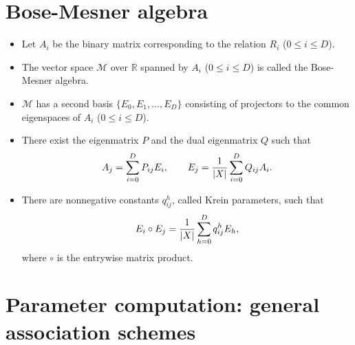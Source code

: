 \documentclass[11pt]{article}
\renewcommand{\textbf}[1]{\textcolor[rgb]{1,0,0}{{#1}}}
\renewcommand{\emph}[1]{\textcolor[rgb]{0,0,1}{{#1}}}
\renewcommand{\sout}[1]{\textcolor[rgb]{0,0.5,0}{{#1}}}
\begin{document}
    \hypertarget{bose-mesner-algebra}{%
\section*{Bose-Mesner algebra}\label{bose-mesner-algebra}}

\begin{itemize}
\item
  Let \textbf{\(A_i\)} be the \emph{binary matrix} corresponding to the
  relation \emph{\(R_i\)} (\(0 \le i \le D\)).
\item
  The vector space \textbf{\(\mathcal{M}\)} over \emph{\(\mathbb{R}\)}
  spanned by \emph{\(A_i\)} (\(0 \le i \le D\)) is called the
  \textbf{Bose-Mesner algebra}.
\item
  \emph{\(\mathcal{M}\)} has a second basis
  \sout{\(\{E_0, E_1, \dots, E_D\}\)} consisting of \emph{projectors} to
  the \emph{common eigenspaces} of \emph{\(A_i\)} (\(0 \le i \le D\)).
\item
  There exist the \textbf{eigenmatrix} \sout{\(P\)} and the \textbf{dual
  eigenmatrix} \sout{\(Q\)} such that \emph{\[
  A_j = \sum_{i=0}^D P_{ij} E_i, \qquad E_j = {1 \over |X|} \sum_{i=0}^D Q_{ij} A_i.
  \]}
\item
  There are \sout{nonnegative} constants \textbf{\(q^h_{ij}\)}, called
  \textbf{Krein parameters}, such that \textbf{\[
  E_i \circ E_j = {1 \over |X|} \sum_{h=0}^D q^h_{ij} E_h ,
  \]} where \textbf{\(\circ\)} is the \emph{entrywise matrix product}.
\end{itemize}

\newpage

    \hypertarget{parameter-computation-general-association-schemes}{%
\section*{Parameter computation: general association
schemes}\label{parameter-computation-general-association-schemes}}
\end{document}

